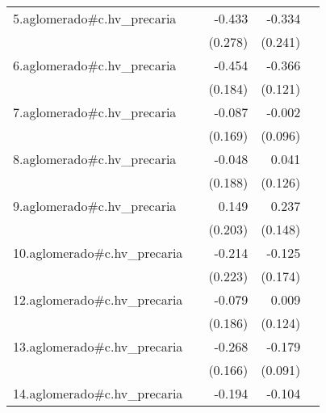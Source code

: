{\begin{longtable}{l*{4}{D{.}{.}{-1}}}
\addlinespace
5.aglomerado#c.hv\_precaria&                     &      -0.433         &      -0.334         &                     \\
            &                     &     (0.278)         &     (0.241)         &                     \\
\addlinespace
6.aglomerado#c.hv\_precaria&                     &      -0.454\sym{*}  &      -0.366\sym{**} &                     \\
            &                     &     (0.184)         &     (0.121)         &                     \\
\addlinespace
7.aglomerado#c.hv\_precaria&                     &      -0.087         &      -0.002         &                     \\
            &                     &     (0.169)         &     (0.096)         &                     \\
\addlinespace
8.aglomerado#c.hv\_precaria&                     &      -0.048         &       0.041         &                     \\
            &                     &     (0.188)         &     (0.126)         &                     \\
\addlinespace
9.aglomerado#c.hv\_precaria&                     &       0.149         &       0.237         &                     \\
            &                     &     (0.203)         &     (0.148)         &                     \\
\addlinespace
10.aglomerado#c.hv\_precaria&                     &      -0.214         &      -0.125         &                     \\
            &                     &     (0.223)         &     (0.174)         &                     \\
\addlinespace
12.aglomerado#c.hv\_precaria&                     &      -0.079         &       0.009         &                     \\
            &                     &     (0.186)         &     (0.124)         &                     \\
\addlinespace
13.aglomerado#c.hv\_precaria&                     &      -0.268         &      -0.179\sym{*}  &                     \\
            &                     &     (0.166)         &     (0.091)         &                     \\
\addlinespace
14.aglomerado#c.hv\_precaria&                     &      -0.194         &      -0.104         &                     \\

\end{longtable}}
